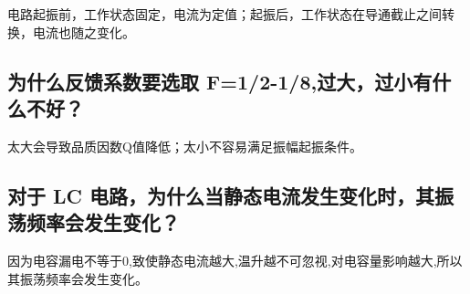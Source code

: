 \documentclass{../source/Experiment}
\begin{document}
        电路起振前，工作状态固定，电流为定值；起振后，工作状态在导通截止之间转换，电流也随之变化。
        \subsection{为什么反馈系数要选取 F=1/2-1/8,过大，过小有什么不好？}

        太大会导致品质因数Q值降低；太小不容易满足振幅起振条件。
        \subsection{对于 LC 电路，为什么当静态电流发生变化时，其振荡频率会发生变化？}
        因为电容漏电不等于0,致使静态电流越大,温升越不可忽视,对电容量影响越大,所以其振荡频率会发生变化。
        
\end{document}
